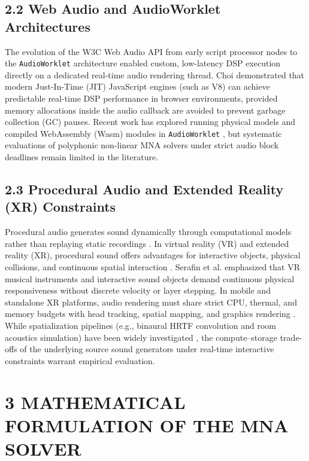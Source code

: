 \documentclass[fleqn,draft]{jaes}
\begin{document}
\subsection{2.2 Web Audio and AudioWorklet Architectures}
The evolution of the W3C Web Audio API \cite{w3c2021webaudio, adenot2015webaudio} from early script processor nodes to the \texttt{AudioWorklet} architecture \cite{choi2018audioworklet} enabled custom, low-latency DSP execution directly on a dedicated real-time audio rendering thread. Choi \cite{choi2018highperformance} demonstrated that modern Just-In-Time (JIT) JavaScript engines (such as V8) can achieve predictable real-time DSP performance in browser environments, provided memory allocations inside the audio callback are avoided to prevent garbage collection (GC) pauses. Recent work has explored running physical models and compiled WebAssembly (Wasm) modules in \texttt{AudioWorklet} \cite{buffa2019webaudio}, but systematic evaluations of polyphonic non-linear MNA solvers under strict audio block deadlines remain limited in the literature.

\subsection{2.3 Procedural Audio and Extended Reality (XR) Constraints}
Procedural audio generates sound dynamically through computational models rather than replaying static recordings \cite{farnell2010designing}. In virtual reality (VR) and extended reality (XR), procedural sound offers advantages for interactive objects, physical collisions, and continuous spatial interaction \cite{serafin2016virtual, turchet2021smart}. Serafin et al. \cite{serafin2016virtual} emphasized that VR musical instruments and interactive sound objects demand continuous physical responsiveness without discrete velocity or layer stepping. In mobile and standalone XR platforms, audio rendering must share strict CPU, thermal, and memory budgets with head tracking, spatial mapping, and graphics rendering \cite{poletti2016spatial, armstrong2020audio}. While spatialization pipelines (e.g., binaural HRTF convolution and room acoustics simulation) have been widely investigated \cite{poletti2016spatial, ziegelwanger2015numerical}, the compute--storage trade-offs of the underlying source sound generators under real-time interactive constraints warrant empirical evaluation.

\section{3 MATHEMATICAL FORMULATION OF THE MNA SOLVER}
\end{document}
